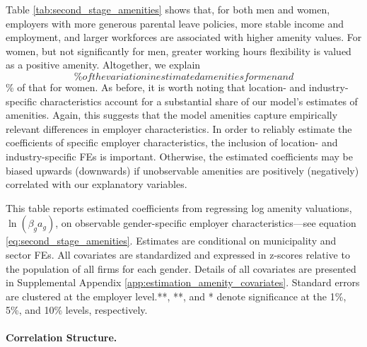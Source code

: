 Table \ref{tab:second_stage_amenities} shows that, for both men and women, employers with more generous parental leave policies, more stable income and employment, and larger workforces are associated with higher amenity values. For women, but not significantly for men, greater working hours flexibility is valued as a positive amenity. Altogether, we explain $$\% of the variation in estimated amenities for men and $$\% of that for women. As before, it is worth noting that location- and industry-specific characteristics account for a substantial share of our model's estimates of amenities. Again, this suggests that the model amenities capture empirically relevant differences in employer characteristics. %
%
\label{revision_2:editor_text_amenity_projections}In order to reliably estimate the coefficients of specific employer characteristics, the inclusion of location- and industry-specific FEs is important. Otherwise, the estimated coefficients may be biased upwards (downwards) if unobservable amenities are positively (negatively) correlated with our explanatory variables.

%
\begin{table}[htbp!]
    \caption{Regressing estimates of amenity valuations on employer characteristics, by gender}
    \label{tab:second_stage_amenities}
    \resizebox{\textwidth}{!}{%
    
    }
    \begin{tablenotes}
        \footnotesize
        This table reports estimated coefficients from regressing log amenity valuations, $\ln(\beta_{g}a_{g})$, on observable gender-specific employer characteristics---see equation \eqref{eq:second_stage_amenities}. Estimates are conditional on municipality and sector FEs. All covariates are standardized and expressed in z-scores relative to the population of all firms for each gender. Details of all covariates are presented in Supplemental Appendix \ref{app:estimation_amenity_covariates}. Standard errors are clustered at the employer level.\ifshowstars ***, **, and * denote significance at the 1\%, 5\%, and 10\% levels, respectively.\fi{}%
    \end{tablenotes}
    \begin{tablenotes}[Source]
        \sourcemodel%
    \end{tablenotes}
\end{table}
%


\paragraph{Correlation Structure.}

